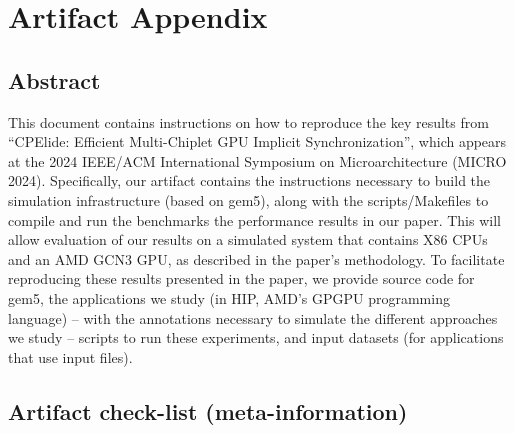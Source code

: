 \documentclass{sigplanconf}
\begin{document}


\appendix
\section{Artifact Appendix}
\label{sec:artifact}

\subsection{Abstract}
\label{subsec:artifact-abs}


This document contains instructions on how to reproduce the key results from ``CPElide: Efficient Multi-Chiplet GPU Implicit Synchronization'', which appears at the 2024 IEEE/ACM International Symposium on Microarchitecture (MICRO 2024).
Specifically, our artifact contains the instructions necessary to build the simulation infrastructure (based on gem5), along with the scripts/Makefiles to compile and run the benchmarks the performance results in our paper.
This will allow evaluation of our results on a simulated system that contains X86 CPUs and an AMD GCN3 GPU, as described in the paper's methodology.
To facilitate reproducing these results presented in the paper, we provide source code for gem5, the applications we study (in HIP, AMD's GPGPU programming language) -- with the annotations necessary to simulate the different approaches we study -- scripts to run these experiments, and input datasets (for applications that use input files).

\subsection{Artifact check-list (meta-information)}
\label{subsec:artifact-checklist}

\end{document}
